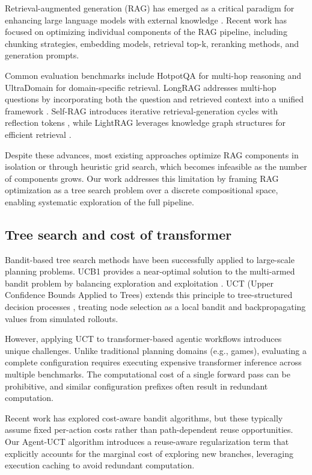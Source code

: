 \documentclass{article}
\begin{document}
    Retrieval-augmented generation (RAG) has emerged as a critical paradigm for enhancing large language models with external knowledge \citep{gao2023retrieval}. Recent work has focused on optimizing individual components of the RAG pipeline, including chunking strategies, embedding models, retrieval top-k, reranking methods, and generation prompts.

    Common evaluation benchmarks include HotpotQA \citep{yang2018hotpotqa} for multi-hop reasoning and UltraDomain \citep{qian2025memorag} for domain-specific retrieval. LongRAG addresses multi-hop questions by incorporating both the question and retrieved context into a unified framework \citep{jiang2024longrag}. Self-RAG introduces iterative retrieval-generation cycles with reflection tokens \citep{asai2024self}, while LightRAG leverages knowledge graph structures for efficient retrieval \citep{guo2024lightrag}.

    Despite these advances, most existing approaches optimize RAG components in isolation or through heuristic grid search, which becomes infeasible as the number of components grows. Our work addresses this limitation by framing RAG optimization as a tree search problem over a discrete compositional space, enabling systematic exploration of the full pipeline.

\subsection{Tree search and cost of transformer}

    Bandit-based tree search methods have been successfully applied to large-scale planning problems. UCB1 provides a near-optimal solution to the multi-armed bandit problem by balancing exploration and exploitation \citep{auer2002finite}. UCT (Upper Confidence Bounds Applied to Trees) extends this principle to tree-structured decision processes \citep{kocsis2006bandit, coquelin2007bandit}, treating node selection as a local bandit and backpropagating values from simulated rollouts.

    However, applying UCT to transformer-based agentic workflows introduces unique challenges. Unlike traditional planning domains (e.g., games), evaluating a complete configuration requires executing expensive transformer inference across multiple benchmarks. The computational cost of a single forward pass can be prohibitive, and similar configuration prefixes often result in redundant computation.

    Recent work has explored cost-aware bandit algorithms, but these typically assume fixed per-action costs rather than path-dependent reuse opportunities. Our Agent-UCT algorithm introduces a reuse-aware regularization term that explicitly accounts for the marginal cost of exploring new branches, leveraging execution caching to avoid redundant computation.
\end{document}
